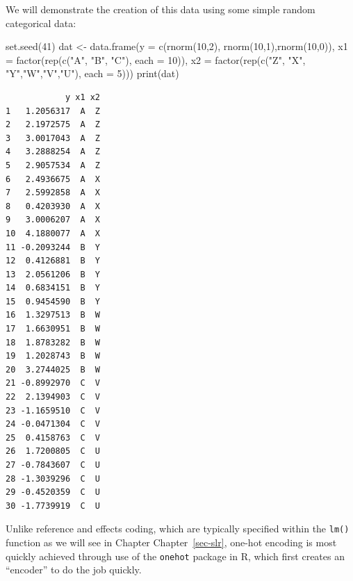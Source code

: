\documentclass[
  letterpaper,
  DIV=11,
  numbers=noendperiod]{scrreprt}
\newenvironment{Shaded}{\begin{snugshade}}{\end{snugshade}}
\newcommand{\AttributeTok}[1]{\textcolor[rgb]{0.40,0.45,0.13}{#1}}
\newcommand{\DecValTok}[1]{\textcolor[rgb]{0.68,0.00,0.00}{#1}}
\newcommand{\FunctionTok}[1]{\textcolor[rgb]{0.28,0.35,0.67}{#1}}
\newcommand{\NormalTok}[1]{\textcolor[rgb]{0.00,0.23,0.31}{#1}}
\newcommand{\OtherTok}[1]{\textcolor[rgb]{0.00,0.23,0.31}{#1}}
\newcommand{\StringTok}[1]{\textcolor[rgb]{0.13,0.47,0.30}{#1}}
\begin{document}
We will demonstrate the creation of this data using some simple random
categorical data:

\begin{Shaded}
\begin{Highlighting}[]
\FunctionTok{set.seed}\NormalTok{(}\DecValTok{41}\NormalTok{)}
\NormalTok{dat }\OtherTok{\textless{}{-}} \FunctionTok{data.frame}\NormalTok{(}\AttributeTok{y =} \FunctionTok{c}\NormalTok{(}\FunctionTok{rnorm}\NormalTok{(}\DecValTok{10}\NormalTok{,}\DecValTok{2}\NormalTok{), }\FunctionTok{rnorm}\NormalTok{(}\DecValTok{10}\NormalTok{,}\DecValTok{1}\NormalTok{),}\FunctionTok{rnorm}\NormalTok{(}\DecValTok{10}\NormalTok{,}\DecValTok{0}\NormalTok{)),}
                \AttributeTok{x1 =} \FunctionTok{factor}\NormalTok{(}\FunctionTok{rep}\NormalTok{(}\FunctionTok{c}\NormalTok{(}\StringTok{"A"}\NormalTok{, }\StringTok{"B"}\NormalTok{, }\StringTok{"C"}\NormalTok{), }\AttributeTok{each =} \DecValTok{10}\NormalTok{)),}
                \AttributeTok{x2 =} \FunctionTok{factor}\NormalTok{(}\FunctionTok{rep}\NormalTok{(}\FunctionTok{c}\NormalTok{(}\StringTok{"Z"}\NormalTok{, }\StringTok{"X"}\NormalTok{, }\StringTok{"Y"}\NormalTok{,}\StringTok{"W"}\NormalTok{,}\StringTok{"V"}\NormalTok{,}\StringTok{"U"}\NormalTok{), }\AttributeTok{each =} \DecValTok{5}\NormalTok{)))}
\FunctionTok{print}\NormalTok{(dat)}
\end{Highlighting}
\end{Shaded}

\begin{verbatim}
            y x1 x2
1   1.2056317  A  Z
2   2.1972575  A  Z
3   3.0017043  A  Z
4   3.2888254  A  Z
5   2.9057534  A  Z
6   2.4936675  A  X
7   2.5992858  A  X
8   0.4203930  A  X
9   3.0006207  A  X
10  4.1880077  A  X
11 -0.2093244  B  Y
12  0.4126881  B  Y
13  2.0561206  B  Y
14  0.6834151  B  Y
15  0.9454590  B  Y
16  1.3297513  B  W
17  1.6630951  B  W
18  1.8783282  B  W
19  1.2028743  B  W
20  3.2744025  B  W
21 -0.8992970  C  V
22  2.1394903  C  V
23 -1.1659510  C  V
24 -0.0471304  C  V
25  0.4158763  C  V
26  1.7200805  C  U
27 -0.7843607  C  U
28 -1.3039296  C  U
29 -0.4520359  C  U
30 -1.7739919  C  U
\end{verbatim}

Unlike reference and effects coding, which are typically specified
within the \texttt{lm()} function as we will see in Chapter
Chapter~\ref{sec-slr}, one-hot encoding is most quickly achieved through
use of the \texttt{onehot} package in R, which first creates an
``encoder'' to do the job quickly.
\end{document}
